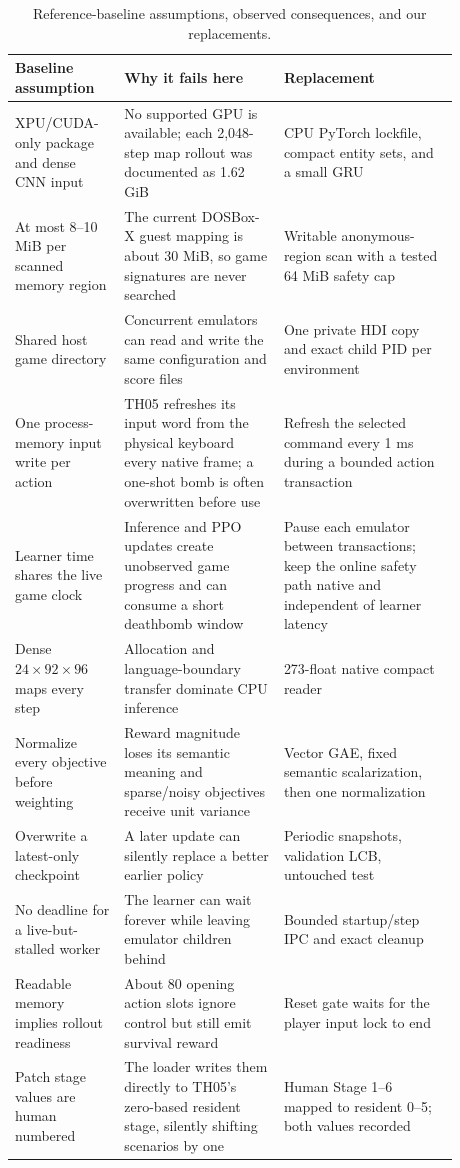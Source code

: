 \documentclass[10pt]{article}
\begin{document}
\begin{table}[ht]
  \centering
  \small
  \caption{Reference-baseline assumptions, observed consequences, and our
  replacements.}
  \label{tab:failures}
  \begin{tabular}{p{0.21\linewidth}p{0.32\linewidth}p{0.35\linewidth}}
    \toprule
    Baseline assumption & Why it fails here & Replacement \\
    \midrule
    XPU/CUDA-only package and dense CNN input & No supported GPU is available;
    each 2,048-step map rollout was documented as 1.62 GiB & CPU PyTorch lockfile,
    compact entity sets, and a small GRU \\
    At most 8--10 MiB per scanned memory region & The current DOSBox-X guest
    mapping is about 30 MiB, so game signatures are never searched & Writable
    anonymous-region scan with a tested 64 MiB safety cap \\
    Shared host game directory & Concurrent emulators can read and write the
    same configuration and score files & One private HDI copy and exact child
    PID per environment \\
    One process-memory input write per action & TH05 refreshes its input word
    from the physical keyboard every native frame; a one-shot bomb is often
    overwritten before use & Refresh the selected command every 1 ms during a
    bounded action transaction \\
    Learner time shares the live game clock & Inference and PPO updates create
    unobserved game progress and can consume a short deathbomb window & Pause
    each emulator between transactions; keep the online safety path native and
    independent of learner latency \\
    Dense $24\times92\times96$ maps every step & Allocation and language-boundary
    transfer dominate CPU inference & 273-float native compact reader \\
    Normalize every objective before weighting & Reward magnitude loses its
    semantic meaning and sparse/noisy objectives receive unit variance & Vector
    GAE, fixed semantic scalarization, then one normalization \\
    Overwrite a latest-only checkpoint & A later update can silently replace a
    better earlier policy & Periodic snapshots, validation LCB, untouched test \\
    No deadline for a live-but-stalled worker & The learner can wait forever
    while leaving emulator children behind & Bounded startup/step IPC and exact
    cleanup \\
    Readable memory implies rollout readiness & About 80 opening action slots
    ignore control but still emit survival reward & Reset gate waits for the
    player input lock to end \\
    Patch stage values are human numbered & The loader writes them directly to
    TH05's zero-based resident stage, silently shifting scenarios by one &
    Human Stage 1--6 mapped to resident 0--5; both values recorded \\
    \bottomrule
  \end{tabular}
\end{table}
\end{document}

